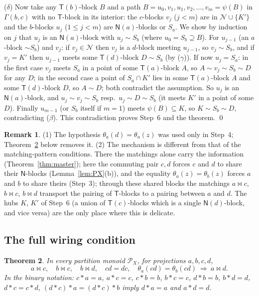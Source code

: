 \documentclass[11pt]{amsart}
\newtheorem{theorem}{Theorem}[section]
\theoremstyle{definition}
\newtheorem{remark}[theorem]{Remark}
\renewcommand{\P}{\mathcal{P}}
\newcommand{\T}{\mathsf{T}}
\newcommand{\N}{\mathsf{N}}
\begin{document}
($\delta$) Now take any $\T(b)$-block $B$ and a path $B=u_0,v_1,u_1,v_2,\dots,v_m=\psi(B)$ in $\Gamma(b,c)$ with no $\T$-block in its interior: the $c$-blocks $v_j$ ($j<m$) are in $\mathcal N\cup\{K'\}$ and the $b$-blocks $u_j$ ($1\le j<m$) are $\N(a)$-blocks or $S_a$. We show by induction on $j$ that $u_j$ is an $\N(a)$-block with $u_j\sim S_b$ (where $u_0=S_b\supseteq B$). For $u_{j-1}$ (an $a$-block $\sim S_b$) and $v_j$: if $v_j\in\mathcal N$ then $v_j$ is a $d$-block meeting $u_{j-1}$, so $v_j\sim S_b$, and if $v_j=K'$ then $u_{j-1}$ meets some $\T(d)$-block $D\sim S_b$ (by ($\gamma$)). If now $u_j=S_a$: in the first case $v_j$ meets $S_a$ in a point of some $\T(a)$-block $A$, so $A\sim v_j\sim S_b\sim D$ for any $D$; in the second case a point of $S_a\cap K'$ lies in some $\T(a)$-block $A$ and some $\T(d)$-block $D$, so $A\sim D$; both contradict the assumption. So $u_j$ is an $\N(a)$-block, and $u_j\sim v_j\sim S_b$ resp.\ $u_j\sim D\sim S_b$ (it meets $K'$ in a point of some $D$). Finally $u_{m-1}$ (or $S_b$ itself if $m=1$) meets $\psi(B)\subseteq K$, so $K\sim S_b\sim D$, contradicting ($\beta$). This contradiction proves Step~6 and the theorem. \qed

\begin{remark}\label{rem:wiring}
(1) The hypothesis $\theta_a(d)=\theta_a(z)$ was used only in Step~4; Theorem~\ref{thm:S} below removes it. (2) The mechanism is different from that of the matching-pattern conditions. There the matchings alone carry the information (Theorem~\ref{thm:master}); here the commuting pair $c,d$ forces $c$ and $d$ to share their $\N$-blocks (Lemma~\ref{lem:PX}(b)), and the equality $\theta_a(z)=\theta_b(z)$ forces $a$ and $b$ to share theirs (Step~3); through these shared blocks the matchings $a\bowtie c$, $b\bowtie c$, $b\bowtie d$ transport the pairing of $\T$-blocks to a pairing between $a$ and $d$. The hubs $K$, $K'$ of Step~6 (a union of $\T(c)$-blocks which is a single $\N(d)$-block, and vice versa) are the only place where this is delicate.
\end{remark}

\subsection{The full wiring condition}\label{subsec:S}

\begin{theorem}\label{thm:S}
In every partition monoid $\P_X$, for projections $a,b,c,d$,
\[
a\bowtie c,\quad b\bowtie c,\quad b\bowtie d,\quad cd=dc,\quad \theta_a(cd)=\theta_b(cd)\ \Longrightarrow\ a\bowtie d .
\tag{S}
\]
In the binary notation: $c*a=a$, $a*c=c$, $c*b=b$, $b*c=c$, $d*b=b$, $b*d=d$, $d*c=c*d$, $(d*c)*a=(d*c)*b$ imply $d*a=a$ and $a*d=d$.
\end{theorem}
\end{document}
